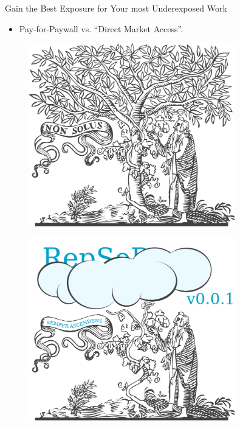 			\begin{frame}{Gain the Best Exposure for Your most Underexposed Work}
				\begin{itemize}
					\item Pay-for-Paywall vs. “Direct Market Access”.
				\end{itemize}
				\begin{minipage}{0.49\textwidth}
					\begin{figure}
						\centering
						\includegraphics[width=0.8\textwidth]{img/elsevier.pdf}
					\end{figure}
				\end{minipage}
				\begin{minipage}{0.49\textwidth}
					\begin{figure}
						\centering
						\includegraphics[width=0.8\textwidth]{img/repsep.pdf}
					\end{figure}
				\end{minipage}
			\end{frame}

